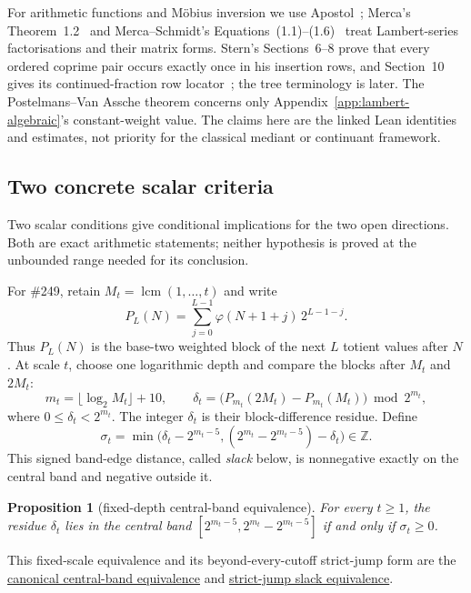 \documentclass[11pt]{article}
\newcommand{\commit}{99f4bf47422abbd8757cbb22b50ba079d764d3a7}
\newcommand{\repobase}{https://github.com/wcook04/plectis-erdos/blob/\commit}
\newcommand{\PK}{Erdos249257}
\newcommand{\lword}[4]{\href{\repobase/\PK/#1\#L#2}{#4}}
\newtheorem{proposition}[theorem]{Proposition}
\theoremstyle{definition}
\theoremstyle{remark}
\newcommand{\Z}{\mathbb{Z}}
\newcommand{\ph}{\varphi}
\newcommand{\lcm}{\operatorname{lcm}}
\begin{document}
{For arithmetic functions and M\"obius inversion we use
Apostol~\cite[\S\S2.6--2.7, pp.~28--32]{apostol};
Merca's Theorem~1.2~\cite[pp.~420--421]{merca2017} and
Merca--Schmidt's Equations~(1.1)--(1.6)~\cite[pp.~31--34]{mercaschmidt}
treat Lambert-series factorisations and their matrix forms.  Stern's
Sections~6--8 prove that every ordered coprime pair occurs exactly once in
his insertion rows, and Section~10 gives its continued-fraction row
locator~\cite[pp.~200--204]{stern1858}; the tree terminology is later.
The Postelmans--Van Assche theorem
concerns only Appendix~\ref{app:lambert-algebraic}'s constant-weight value.
The claims here are the linked Lean identities and estimates, not priority for
the classical mediant or continuant framework.
}

\subsection{Two concrete scalar criteria}

Two scalar conditions give conditional implications for the two open
directions.  Both are exact arithmetic statements; neither hypothesis is
proved at the unbounded range needed for its conclusion.

For \#249, retain $M_t=\lcm(1,\ldots,t)$ and write
\[
 P_L(N)=\sum_{j=0}^{L-1}\ph(N+1+j)\,2^{L-1-j}.
\]
Thus \(P_L(N)\) is the base-two weighted block of the next \(L\) totient
values after \(N\).  At scale \(t\), choose one logarithmic depth and compare
the blocks after \(M_t\) and \(2M_t\):
\[
 m_t=\lfloor\log_2 M_t\rfloor+10,\qquad
 \delta_t=\bigl(P_{m_t}(2M_t)-P_{m_t}(M_t)\bigr)\bmod 2^{m_t},
\]
where $0\le \delta_t<2^{m_t}$.  The integer \(\delta_t\) is their block-difference
residue.  Define
\[
  \sigma_t=\min\bigl(\delta_t-2^{m_t-5},
    (2^{m_t}-2^{m_t-5})-\delta_t\bigr)\in\Z.
\]
This signed band-edge distance, called \emph{slack} below, is nonnegative
exactly on the central band and negative outside it.

\begin{proposition}[fixed-depth central-band equivalence]\label{res:slackfrontier}
For every $t\ge1$, the residue \(\delta_t\) lies in the central band
$[2^{m_t-5},2^{m_t}-2^{m_t-5}]$ if and only if $\sigma_t\ge0$.
\end{proposition}
\noindent This fixed-scale equivalence and its beyond-every-cutoff strict-jump
form are the
\lword{DiagonalFreshLossBridge.lean}{2667}{canonicalAdjacentSuffixCentral_iff_slack_nonneg}{canonical central-band equivalence}
and
\lword{DiagonalFreshLossBridge.lean}{2757}{canonicalAdjacentSuffixJumpCentralSupply_iff_slackSupply}{strict-jump slack equivalence}.
\end{document}

